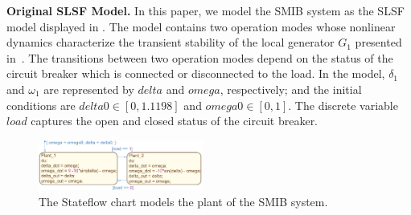 \vspace{0.5em}
\noindent
{\bf Original SLSF Model.} In this paper, we model the SMIB system as the SLSF model displayed in . The model contains two operation modes whose nonlinear dynamics characterize the transient stability of the local generator $G_1$ presented in~\cite{farraj2014practical}. The transitions between two operation modes depend on the status of the circuit breaker which is connected or disconnected to the load.
%
In the model, $\delta_1$ and $\omega_1$ are represented by $delta$ and $omega$, respectively; and the initial conditions are $delta0 \in [0, 1.1198]$ and $omega0 \in [0, 1]$. The discrete variable $load$ captures the open and closed status of the circuit breaker.
%

%
\begin{figure}[tbp]%
	\centering%
    \includegraphics[width=0.48\textwidth]{image/smib_plant_model}%
		\vspace{-1em}
	\caption{The Stateflow chart models the plant of the SMIB system.}%
	\vspace{-1em}
\end{figure}%
%
%
%
%
